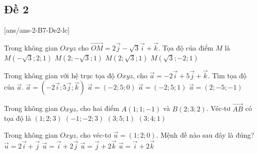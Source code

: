 \subsection{Đề 2}
[ans/ans-2-B7-De2-lc]
\caulc
\begin{ex}%
	Trong không gian $Oxyz$ cho $\overrightarrow{OM}=2\overrightarrow{j}-\sqrt{3}\overrightarrow{i}+\overrightarrow{k}$. Tọa độ của điểm $M$ là
	\choice
	{\True $M(-\sqrt{3};2;1)$}
	{$M(2;-\sqrt{3};1)$}
	{$M(2;\sqrt{3};1)$}
	{$M(\sqrt{3};-2;1)$}
\end{ex}
\begin{ex}%
	Trong không gian với hệ trục tọa độ $ Oxyz $, cho $\overrightarrow a=-2\overrightarrow i+5\overrightarrow j+\overrightarrow k$. Tìm tọa độ của $ \overrightarrow a $.
	\choice
	{$\overrightarrow a =( -2\overrightarrow i;5\overrightarrow j;\overrightarrow k)$}
	{$ \overrightarrow a=(-2;5;0)$}
	{\True $\overrightarrow a =(-2;5;1) $}
	{$ \overrightarrow a =(2;-5;-1)$}
\end{ex}
\begin{ex}%
	Trong không gian $Oxyz$, cho hai điểm $A(1;1;-1)$ và $B(2;3;2)$. Véc-tơ $\overrightarrow{AB}$ có tọa độ là
	\choice
	{\True $(1;2;3)$}
	{$(-1;-2;3)$}
	{$(3;5;1)$}
	{$(3;4;1)$}
\end{ex}
\begin{ex}%
	Trong không gian $Oxyz$, cho véc-tơ $ \overrightarrow{u}=(1;2;0)$. Mệnh đề nào sau đây là đúng?
	\choice
	{$ \overrightarrow{u}=2\overrightarrow{i}+\overrightarrow{j} $}
	{\True $ \overrightarrow{u}=\overrightarrow{i}+2\overrightarrow{j} $}
	{$ \overrightarrow{u}=\overrightarrow{j}+2\overrightarrow{k} $}
	{$ \overrightarrow{u}=\overrightarrow{i}+2\overrightarrow{k} $}
\end{ex}
